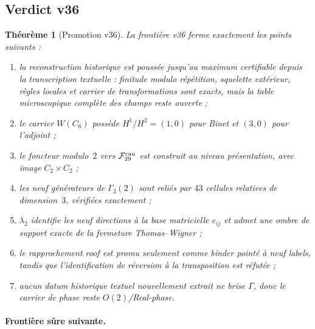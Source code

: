 \documentclass[11pt,a4paper]{article}
\newtheorem{theorem}{Théorème}[section]
\begin{document}
\subsection{Verdict v36}

\begin{theorem}[Promotion v36]\label{thm:v36-verdict}
La frontière v36 ferme exactement les points suivants :
\begin{enumerate}[label=\textup{(\roman*)}]
\item la reconstruction historique est poussée jusqu'au maximum certifiable depuis la transcription textuelle : finitude modulo répétition, squelette extérieur, règles locales et carrier de transformations sont exacts, mais la table microscopique complète des champs reste ouverte ;
\item le carrier $W(C_6)$ possède $H^1/H^2=(1,0)$ pour Binet et $(3,0)$ pour l'adjoint ;
\item le foncteur modulo~$2$ vers $\mathcal F_{29}^{\rm can}$ est construit au niveau présentation, avec image $C_2\times C_2$ ;
\item les neuf générateurs de $\Gamma_3(2)$ sont reliés par $43$ cellules relatives de dimension~$3$, vérifiées exactement ;
\item $\lambda_2$ identifie les neuf directions à la base matricielle $e_{ij}$ et admet une ombre de support exacte de la fermeture Thomas--Wigner ;
\item le rapprochement roof est promu seulement comme binder pointé à neuf labels, tandis que l'identification de réversion à la transposition est réfutée ;
\item aucun datum historique textuel nouvellement extrait ne brise $\Gamma$, donc le carrier de phase reste $O(2)$/Real-phase.
\end{enumerate}
\end{theorem}

\paragraph{Frontière sûre suivante.}
\begin{center}
\end{center}
\end{document}
